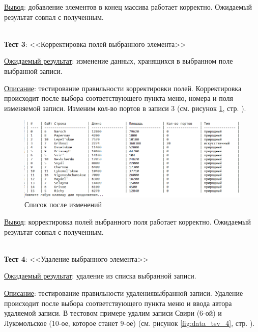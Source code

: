 \underline{Вывод}: добавление элементов в конец массива работает корректно. Ожидаемый результат совпал с полученным.

\hspace{0pt}\\



\textbf{Тест 3}: <<Корректировка полей выбранного элемента>>

\underline{Ожидаемый результат}: изменение данных, хранящихся в выбранном поле выбранной записи.

\underline{Описание}: тестирование правильности корректировки полей. Корректировка происходит после выбора соответствующего пункта меню, номера и поля изменяемой записи. Изменим кол-во портов в записи 3 (см. рисунок \ref{fig:data_tsv_3}, стр. \pageref{fig:data_tsv_3}).


\begin{figure}[!hp]
    \begin{center}
        \includegraphics[width=16cm]{_input/tests/data-tsv-3.png}
    \end{center}
    \caption{Список после изменений\label{fig:data_tsv_3}}
\end{figure}

\underline{Вывод}: корректировка полей выбранного поля работает корректно. Ожидаемый результат совпал с полученным.

\hspace{0pt}\\



\textbf{Тест 4}: <<Удаление выбранного элемента>>

\underline{Ожидаемый результат}: удаление из списка выбранной записи.

\underline{Описание}: тестирование правильности удалениявыбранной записи. Удаление происходит после выбора соответствующего пункта меню и ввода автора удаляемой записи. В тестовом примере удалим записи Свири (6-ой) и Лукомольское (10-ое, которое станет 9-ое) (см. рисунок \ref{fig:data_tsv_4}, стр. \pageref{fig:data_tsv_4}).

